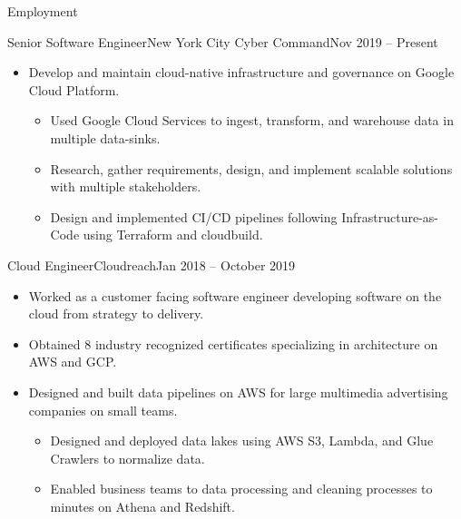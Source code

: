 \documentclass[]{mcdowellcv}
\begin{document}
    \makeheader

    \begin{cvsection}{Employment}
        \begin{cvsubsection}{Senior Software Engineer}{New York City Cyber Command}{Nov 2019 – Present}
          \begin{itemize}
                \item Develop and maintain cloud-native infrastructure and governance on Google Cloud Platform.
                    \begin{itemize}
                            \item Used Google Cloud Services to ingest, transform, and warehouse data in multiple  data-sinks.
                            \item Research, gather requirements, design, and implement scalable solutions with multiple stakeholders.
                            \item Design and implemented CI/CD pipelines following Infrastructure-as-Code using Terraform and cloudbuild.
                    \end{itemize}
                \end{itemize}
        \end{cvsubsection}

        \begin{cvsubsection}{Cloud Engineer}{Cloudreach}{Jan 2018 – October 2019}
            \begin{itemize}
                \item Worked as a customer facing software engineer developing software on the cloud from strategy to delivery. 
                \item Obtained 8 industry recognized certificates specializing in architecture on AWS and GCP.
                \end{itemize}
                \begin{itemize}
                    \item Designed and built data pipelines on AWS for large multimedia advertising companies on small teams.
                    \begin{itemize}
                        \item Designed and deployed data lakes using AWS S3, Lambda, and Glue Crawlers to normalize data.
                        \item Enabled business teams to data processing and cleaning processes to minutes on Athena and Redshift.
                    \end{itemize}
                \end{itemize}
        \end{cvsubsection}


\end{cvsection}
\end{document}
